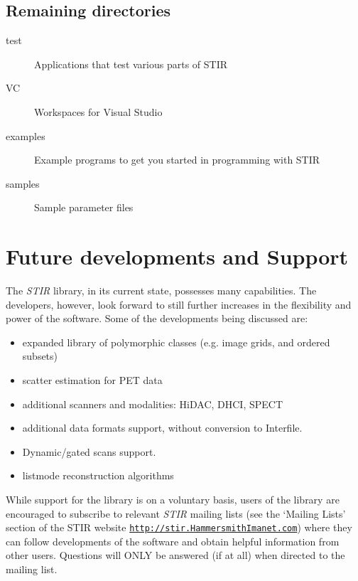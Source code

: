 \documentclass{article}
\def\R2Lurl#1#2{\mbox{\href{#1}{\tt #2}}}
\begin{document}
\subsection{Remaining directories}
\begin{description}
\item[test]
  Applications that test various parts of STIR
\item[VC]
  Workspaces for Visual Studio
\item[examples]
  Example programs to get you started in programming with STIR
\item[samples]
  Sample parameter files
\end{description}


\section{
Future developments and Support}

The \textit{STIR} library, in its current state, possesses many capabilities. 
The developers, however, look forward to still further increases 
in the flexibility and power of the software. Some of the developments 
being discussed are:

\begin{itemize}
\item
expanded library of polymorphic classes (e.g. image grids, and 
ordered subsets)
\item 
scatter estimation for PET data
\item
additional scanners and modalities: HiDAC, DHCI, SPECT
\item
additional data formats support, without conversion to Interfile.
\item
Dynamic/gated scans support.
\item
listmode reconstruction algorithms
\end{itemize}


While support for the library is on a voluntary basis, users 
of the library are encouraged to subscribe to relevant \textit{STIR} 
mailing lists (see the `Mailing Lists' section of the STIR website 
\R2Lurl{http://stir.HammersmithImanet.com/ }{http://stir.HammersmithImanet.com}) 
where they can follow developments of the software and obtain 
helpful information from other users. Questions will ONLY be 
answered (if at all) when directed to the mailing list.
\end{document}
